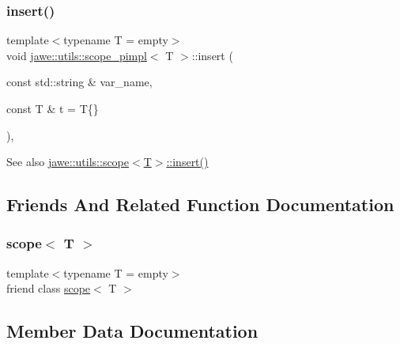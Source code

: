 \subsubsection{\texorpdfstring{insert()}{insert()}}
{\footnotesize\ttfamily template$<$typename T = empty$>$ \\
void \hyperlink{classjawe_1_1utils_1_1scope__pimpl}{jawe\+::utils\+::scope\+\_\+pimpl}$<$ T $>$\+::insert (\begin{DoxyParamCaption}\item[{const std\+::string \&}]{var\+\_\+name,  }\item[{const T \&}]{t = {\ttfamily T\{\}} }\end{DoxyParamCaption})\hspace{0.3cm}{\ttfamily [inline]}, {\ttfamily [private]}}

\begin{DoxySeeAlso}{See also}
\hyperlink{classjawe_1_1utils_1_1scope_ab64ac5cc3bce5c9909aff566ac50fac0}{jawe\+::utils\+::scope$<$\+T$>$\+::insert()} 
\end{DoxySeeAlso}


\subsection{Friends And Related Function Documentation}
\mbox{\label{classjawe_1_1utils_1_1scope__pimpl_a158486513ead5908db686c9f04b48af8}} 
\subsubsection{\texorpdfstring{scope$<$ T $>$}{scope< T >}}
{\footnotesize\ttfamily template$<$typename T = empty$>$ \\
friend class \hyperlink{classjawe_1_1utils_1_1scope}{scope}$<$ T $>$\hspace{0.3cm}{\ttfamily [friend]}}



\subsection{Member Data Documentation}
\mbox{\label{classjawe_1_1utils_1_1scope__pimpl_aec4e4f947e22b0ff1da66856b4dbd88e}} 

